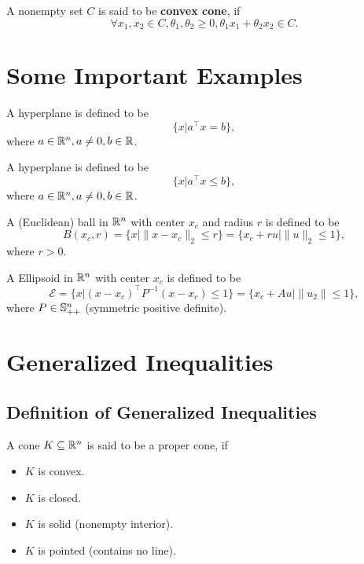 \begin{definition}
	A nonempty set $C$ is said to be \textbf{convex cone}, if $$\forall x_1,x_2\in C, \theta_1,\theta_2\geq 0,\theta_1 x_1+\theta_2 x_2\in C.$$
\end{definition}

\section{Some Important Examples}

\begin{definition}[Hyperplane]
	A hyperplane is defined to be $$\{x|a^{\top}x=b\},$$ where $a\in{\mathbb R}^n,a\neq 0,b\in{\mathbb R}$.
\end{definition}

\begin{definition}[Halfspace]
	A hyperplane is defined to be $$\{x|a^{\top}x\leq b\},$$ where $a\in{\mathbb R}^n,a\neq 0,b\in{\mathbb R}$.
\end{definition}

\begin{definition}
	A (Euclidean) ball in ${\mathbb R}^n$ with center $x_c$ and radius $r$ is defined to be $$B(x_c,r)=\{x\vert\|x-x_c\|_2\leq r\}=\{x_c+ru\vert\|u\|_2\leq 1\},$$ where $r>0$.
\end{definition}

\begin{definition}[Ellipsoid]
	A Ellipsoid in ${\mathbb R}^n$ with center $x_c$ is defined to be $$\mathcal{E}=\{x\vert(x-x_c)^{\top}P^{-1}(x-x_c)\leq 1\}=\{x_c+Au\vert \|u_2\|\leq 1\},$$ where $P\in{\mathbb S}^{n}_{++}$ (symmetric positive definite).
\end{definition}

\section{Generalized Inequalities}

\subsection{Definition of Generalized Inequalities}

\begin{definition} \label{def:proper-cone}
	A cone $K\subseteq{\mathbb R}^n$ is said to be a proper cone, if
	\begin{itemize}
		\item $K$ is convex.
		\item $K$ is closed.
		\item $K$ is solid (nonempty interior).
		\item $K$ is pointed (contains no line).
	\end{itemize}
\end{definition}


